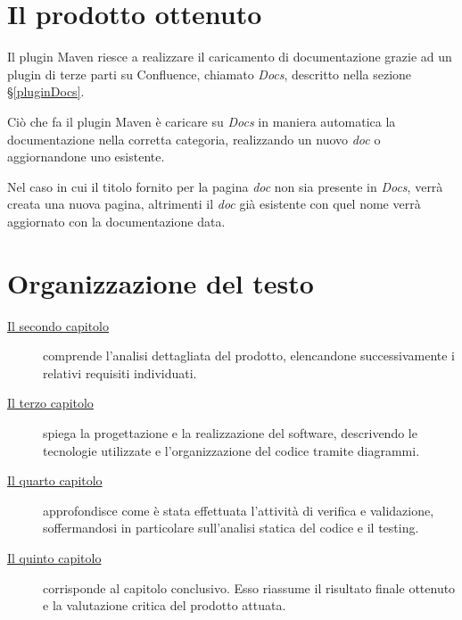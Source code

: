 \section{Il prodotto ottenuto}
Il plugin Maven riesce a realizzare il caricamento di documentazione grazie ad un plugin di terze parti su Confluence, chiamato \emph{Docs}, descritto nella sezione \S\ref{pluginDocs}.

Ciò che fa il plugin Maven è caricare su \emph{Docs} in maniera automatica la documentazione nella corretta categoria, realizzando un nuovo \emph{doc} o aggiornandone uno esistente.

Nel caso in cui il titolo fornito per la pagina \emph{doc} non sia presente in \emph{Docs}, verrà creata una nuova pagina, altrimenti il \emph{doc} già esistente con quel nome verrà aggiornato con la documentazione data.

\section{Organizzazione del testo}

\begin{description}
    \item[{\hyperref[cap:analisi-requisiti]{Il secondo capitolo}}] comprende l'analisi dettagliata del prodotto, elencandone successivamente i relativi requisiti individuati.

    \item[{\hyperref[cap:progettazione]{Il terzo capitolo}}] spiega la progettazione e la realizzazione del software, descrivendo le tecnologie utilizzate e l'organizzazione del codice tramite diagrammi.

    \item[{\hyperref[cap:testing]{Il quarto capitolo}}] approfondisce come è stata effettuata l'attività di verifica e validazione, soffermandosi in particolare sull'analisi statica del codice e il testing.

    \item[{\hyperref[cap:conclusioni]{Il quinto capitolo}}] corrisponde al capitolo conclusivo. Esso riassume il risultato finale ottenuto e la valutazione critica del prodotto attuata.

\end{description}

